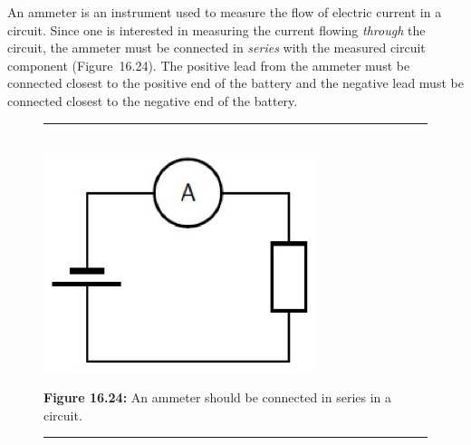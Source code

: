         
        \label{m38773*id62484}An ammeter is an instrument used to measure the flow of electric
current in a circuit. Since one is interested in measuring the
current flowing \textsl{through} the circuit, the ammeter
must be connected in \textsl{series} with the measured circuit
component (Figure~16.24). The positive lead from the ammeter must be connected closest to the positive end of the battery and the negative lead must be connected closest to the negative end of the battery.\par 
        
    \setcounter{subfigure}{0}


	\begin{figure}[H] %
    \begin{center}
    \rule[.1in]{\figurerulewidth}{.005in} \\
        \label{m38773*uid75!!!underscore!!!media}\label{m38773*uid75!!!underscore!!!printimage}\includegraphics[width=300px]{col11305.imgs/m38773_PG10C9_035.png} %
        
      \vspace{2pt}
    \vspace{\rubberspace}\par \begin{cnxcaption}
	  \small \textbf{Figure 16.24: }An ammeter should be connected in series in a circuit.
	\end{cnxcaption}
      
    \vspace{.1in}
    \rule[.1in]{\figurerulewidth}{.005in} \\
        
    \end{center}

 \end{figure}   

    \addtocounter{footnote}{-0}
    
